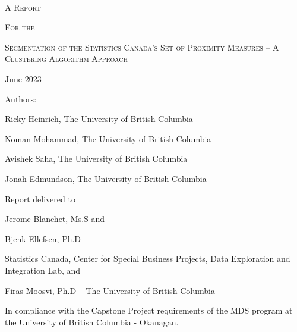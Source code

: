 \documentclass[11pt, a4paper]{article}
\newcommand{\comment}[1]{}
\begin{document}
\begin{center}
$ $

\vspace{2 pc}
\textsc{A Report} \par
\small{\textsc{For the}} \par
\Large{\textsc{Segmentation of the Statistics Canada’s Set of Proximity Measures – A
Clustering Algorithm Approach}}
\par
\vspace{0.917 pc} %
\par
\normalsize{ }

\thispagestyle{firststyle}


\vspace{8 pc} %


\par
June 2023
\par
\vspace{10pc}

\begin{small}
Authors: \par
Ricky Heinrich, The University of British Columbia \par
Noman Mohammad, The University of British Columbia \par
Avishek Saha, The University of British Columbia \par
Jonah Edmundson, The University of British Columbia
\end{small}


\par
\vfill
\par
\begin{footnotesize}
Report delivered to \par
Jerome Blanchet, Ms.S and \par
Bjenk Ellefsen, Ph.D – \par
Statistics Canada, Center for Special Business Projects, Data Exploration and Integration Lab, and \par
Firas Moosvi, Ph.D – The University of British Columbia
\end{footnotesize}

\comment{
\noindent\small{Statistics Canada Liaison - Jérôme Blanchet, Bjenk Ellefsen}
\par
\noindent\small{UBCO Project Supervisor - His Excellency Dr. Firas Moosvi}
}
\par
\vspace{2pc}
\par
\noindent\tiny{In compliance with the Capstone Project requirements of the MDS program at the University of British Columbia - Okanagan.}
\end{center}
\normalsize
\end{document}
